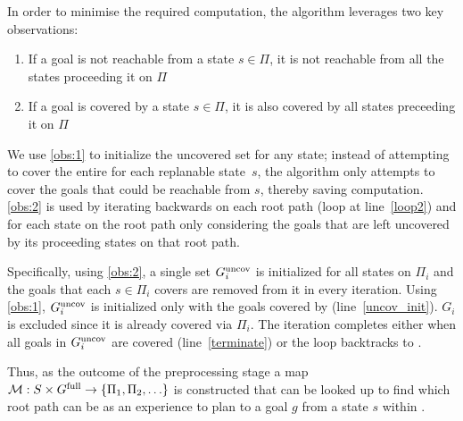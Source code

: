 \documentclass[conference]{IEEEtran}
\begin{document}
In order to minimise the required computation, the algorithm leverages two key observations:

\begin{enumerate}[label={\textbf{O\arabic*}},leftmargin=0.75cm]
    \item \label{obs:1}
    If a goal is not reachable from a state $s \in \Pi$, it is not reachable from all the states proceeding it on $\Pi$
    \item \label{obs:2}
    If a goal is covered by a state $s \in \Pi$, it is also covered by all states preceeding it on $\Pi$
\end{enumerate}

We use \ref{obs:1} to initialize the uncovered set for any state; instead of attempting to cover the entire \Gfull for each replanable state~$s$, the algorithm only attempts to cover the goals that could be reachable from $s$, thereby saving computation.
%
\ref{obs:2} is used by iterating backwards on each root path (loop at line~\ref{loop2}) and for each state on the root path only considering the goals that are left uncovered by its proceeding states on that root path.

Specifically, using \ref{obs:2}, a single set $G^{\textrm{uncov}}_i$ is initialized for all states on $\Pi_i$ and the goals that each $s \in \Pi_i$ covers are removed from it in every iteration.  Using \ref{obs:1}, $G^{\textrm{uncov}}_i$ is initialized only with the goals covered by \Sstart (line~\ref{uncov_init}). $G_i$ is excluded since it is already covered via $\Pi_i$. The iteration completes either when all goals in $G^{\textrm{uncov}}_i$ are covered (line~\ref{terminate}) or the loop backtracks to \Sstart.

Thus, as the outcome of the preprocessing stage a map $\mathcal{M}: S \times G^{\textrm{full}} \rightarrow \{ \Pi_1, \Pi_2, \ldots \}$ is constructed that can be looked up to find which root path can be as an experience to plan to a goal $g$ from a state $s$ within \Tbound.
\end{document}
